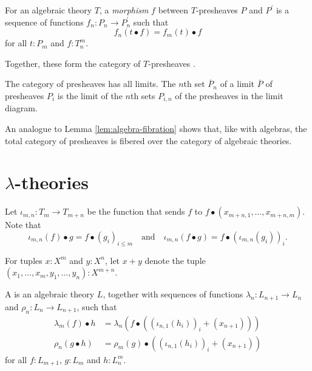 \begin{definition}
  For an algebraic theory $ T $, a \textit{morphism} $ f $ between $ T $-presheaves $ P $ and $ P^\prime $ is a sequence of functions $ f_n: P_n \to P^\prime_n $ such that
  \[ f_n(t \bullet f) = f_m(t) \bullet f \]
  for all $ t: P_m $ and $ f: T_n^m $.
\end{definition}

Together, these form the category of $ T $-presheaves .

\begin{remark}
  The category of presheaves has all limits. The $ n $th set $ \overline{P}_n $ of a limit $ \overline{P} $ of presheaves $ P_i $ is the limit of the $ n $th sets $ P_{i, n} $ of the presheaves in the limit diagram.
\end{remark}

An analogue to Lemma \ref{lem:algebra-fibration} shows that, like with algebras, the total category of presheaves is fibered over the category of algebraic theories.

\section{\texorpdfstring{$ \lambda $-}{lambda-}theories}

Let $ \iota_{m, n} : T_m \to T_{m + n} $ be the function that sends $ f $ to $ f \bullet (x_{m + n, 1}, \dots, x_{m + n, m}) $. Note that
\[ \iota_{m, n}(f) \bullet g = f \bullet (g_i)_{i \leq m} \quad \text{and} \quad \iota_{m, n}(f \bullet g) = f \bullet (\iota_{m, n}(g_i))_i. \]

For tuples $ x : X^m $ and $ y: X^n $, let $ x + y $ denote the tuple $ (x_1, \dots, x_m, y_1, \dots, y_n) : X^{m + n} $.

\begin{definition}
  A  is an algebraic theory $ L $, together with sequences of functions $ \lambda_n: L_{n + 1} \to L_n $ and $ \rho_n: L_n \to L_{n + 1} $, such that
  \begin{align*}
    \lambda_m(f) \bullet h &= \lambda_n(f \bullet ((\iota_{n, 1}(h_i))_i + (x_{n + 1})))\\
    \rho_n(g \bullet h) &= \rho_m(g) \bullet ((\iota_{n, 1}(h_i))_i + (x_{n + 1}))
  \end{align*}
  for all $ f: L_{m + 1} $, $ g: L_m $ and $ h: L_n^m $.
\end{definition}


